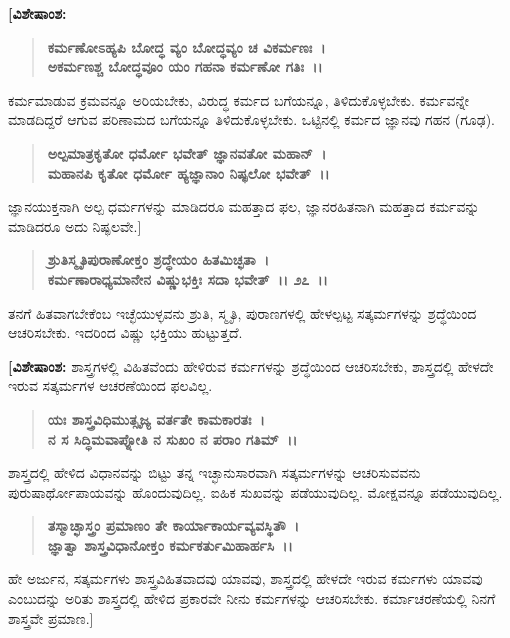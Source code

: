 \textbf{[ವಿಶೇಷಾಂಶ:}

\begin{verse}
\textbf{ಕರ್ಮಣೋಽಹ್ಯಪಿ ಬೋದ್ಧ ವ್ಯಂ ಬೋದ್ಧವ್ಯಂ ಚ ವಿಕರ್ಮಣಃ~।}\\\textbf{ಅಕರ್ಮಣಶ್ಚ ಬೋದ್ಧವೂಂ ಯಂ ಗಹನಾ ಕರ್ಮಣೋ ಗತಿಃ~।।}
\end{verse}

ಕರ್ಮಮಾಡುವ ಕ್ರಮವನ್ನೂ ಅರಿಯಬೇಕು, ವಿರುದ್ಧ ಕರ್ಮದ ಬಗೆಯನ್ನೂ, ತಿಳಿದುಕೊಳ್ಳಬೇಕು. ಕರ್ಮವನ್ನೇ ಮಾಡದಿದ್ದರೆ ಆಗುವ ಪರಿಣಾಮದ ಬಗೆಯನ್ನೂ ತಿಳಿದುಕೊಳ್ಳಬೇಕು. ಒಟ್ಟಿನಲ್ಲಿ ಕರ್ಮದ ಜ್ಞಾನವು ಗಹನ (ಗೂಢ).

\begin{verse}
\textbf{ಅಲ್ಪಮಾತ್ರಕೃತೋ ಧರ್ಮೋ ಭವೇತ್ ಜ್ಞಾನವತೋ ಮಹಾನ್~।}\\\textbf{ಮಹಾನಪಿ ಕೃತೋ ಧರ್ಮೋ ಹ್ಯಜ್ಞಾನಾಂ ನಿಷ್ಫಲೋ ಭವೇತ್~।।}
\end{verse}

ಜ್ಞಾನಯುಕ್ತನಾಗಿ ಅಲ್ಪ ಧರ್ಮಗಳನ್ನು ಮಾಡಿದರೂ ಮಹತ್ತಾದ ಫಲ, ಜ್ಞಾನರಹಿತನಾಗಿ ಮಹತ್ತಾದ ಕರ್ಮವನ್ನು ಮಾಡಿದರೂ ಅದು ನಿಷ್ಫಲವೇ.]

\begin{verse}
\textbf{ಶ್ರುತಿಸ್ಮೃತಿಪುರಾಣೋಕ್ತಂ ಶ್ರದ್ಧೇಯಂ ಹಿತಮಿಚ್ಛತಾ~।}\\\textbf{ಕರ್ಮಣಾರಾಧ್ಯಮಾನೇನ ವಿಷ್ಣುಭಕ್ತಿಃ ಸದಾ ಭವೇತ್~।। ೨೭~।।}
\end{verse}

ತನಗೆ ಹಿತವಾಗಬೇಕೆಂಬ ಇಚ್ಛೆಯುಳ್ಳವನು ಶ್ರುತಿ, ಸ್ಮೃತಿ, ಪುರಾಣಗಳಲ್ಲಿ ಹೇಳಲ್ಪಟ್ಟ ಸತ್ಕರ್ಮಗಳನ್ನು ಶ್ರದ್ಧೆಯಿಂದ ಆಚರಿಸಬೇಕು. ಇದರಿಂದ ವಿಷ್ಣು ಭಕ್ತಿಯು ಹುಟ್ಟುತ್ತದೆ.

\textbf{[ವಿಶೇಷಾಂಶ:} ಶಾಸ್ತ್ರಗಳಲ್ಲಿ ವಿಹಿತವೆಂದು ಹೇಳಿರುವ ಕರ್ಮಗಳನ್ನು ಶ್ರದ್ಧೆಯಿಂದ ಆಚರಿಸ\-ಬೇಕು, ಶಾಸ್ತ್ರದಲ್ಲಿ ಹೇಳದೇ ಇರುವ ಸತ್ಕರ್ಮಗಳ ಆಚರಣೆಯಿಂದ ಫಲವಿಲ್ಲ.

\begin{verse}
\textbf{ಯಃ ಶಾಸ್ತ್ರವಿಧಿಮುತ್ಸೃಜ್ಯ ವರ್ತತೇ ಕಾಮಕಾರತಃ~।}\\\textbf{ನ ಸ ಸಿದ್ಧಿಮವಾಪ್ನೋತಿ ನ ಸುಖಂ ನ ಪರಾಂ ಗತಿಮ್~।।} 
\end{verse}

ಶಾಸ್ತ್ರದಲ್ಲಿ ಹೇಳಿದ ವಿಧಾನವನ್ನು ಬಿಟ್ಟು ತನ್ನ ಇಚ್ಛಾನುಸಾರವಾಗಿ ಸತ್ಕರ್ಮಗಳನ್ನು ಆಚರಿಸು\-ವವನು ಪುರುಷಾರ್ಥೋಪಾಯವನ್ನು ಹೊಂದುವುದಿಲ್ಲ. ಐಹಿಕ ಸುಖವನ್ನು ಪಡೆಯುವುದಿಲ್ಲ. ಮೋಕ್ಷವನ್ನೂ ಪಡೆಯುವುದಿಲ್ಲ.

\begin{verse}
\textbf{ತಸ್ಮಾಚ್ಛಾಸ್ತ್ರಂ ಪ್ರಮಾಣಂ ತೇ ಕಾರ್ಯಾಕಾರ್ಯವ್ಯವಸ್ಥಿತೌ~।}\\\textbf{ಜ್ಞಾತ್ವಾ ಶಾಸ್ತ್ರವಿಧಾನೋಕ್ತಂ ಕರ್ಮಕರ್ತುಮಿಹಾರ್ಹಸಿ~।।} 
\end{verse}

ಹೇ ಅರ್ಜುನ, ಸತ್ಕರ್ಮಗಳು ಶಾಸ್ತ್ರವಿಹಿತವಾದವು ಯಾವವು, ಶಾಸ್ತ್ರದಲ್ಲಿ ಹೇಳದೇ ಇರುವ ಕರ್ಮಗಳು ಯಾವವು ಎಂಬುದನ್ನು ಅರಿತು ಶಾಸ್ತ್ರದಲ್ಲಿ ಹೇಳಿದ ಪ್ರಕಾರವೇ ನೀನು ಕರ್ಮಗಳನ್ನು ಆಚರಿಸಬೇಕು. ಕರ್ಮಾಚರಣೆಯಲ್ಲಿ ನಿನಗೆ ಶಾಸ್ತ್ರವೇ ಪ್ರಮಾಣ.]

